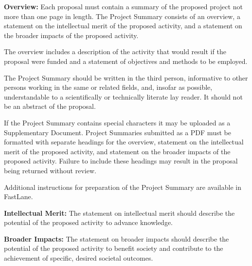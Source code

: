 \textbf{Overview:} 
%
Each proposal must contain a summary of the proposed project not more
than one page in length.  The Project Summary consists of an overview,
a statement on the intellectual merit of the proposed activity, and a
statement on the broader impacts of the proposed activity.

The overview includes a description of the activity that would result
if the proposal were funded and a statement of objectives and methods
to be employed.

The Project Summary should be written in the third person, informative
to other persons working in the same or related fields, and, insofar
as possible, understandable to a scientifically or technically
literate lay reader.  It should not be an abstract of the proposal.

If the Project Summary contains special characters it may be uploaded
as a Supplementary Document.  Project Summaries submitted as a PDF
must be formatted with separate headings for the overview, statement
on the intellectual merit of the proposed activity, and statement on
the broader impacts of the proposed activity.  Failure to include
these headings may result in the proposal being returned without
review.

Additional instructions for preparation of the Project Summary are
available in FastLane.


\vspace*{\baselineskip}
\textbf{Intellectual Merit:}
%
The statement on intellectual merit should describe the potential of
the proposed activity to advance knowledge.

\vspace*{\baselineskip}
\textbf{Broader Impacts:} 
%
The statement on broader impacts should describe the potential of the
proposed activity to benefit society and contribute to the achievement
of specific, desired societal outcomes.
